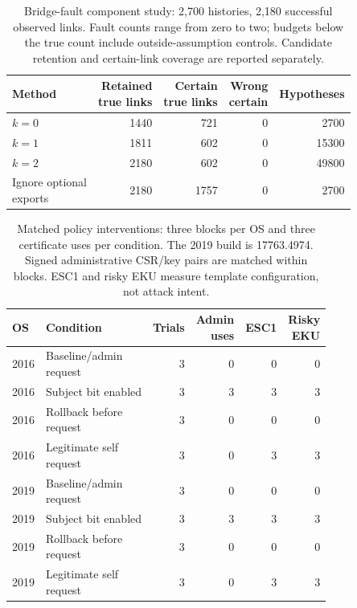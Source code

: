 \begin{table}[tbp]
\centering
\caption{Bridge-fault component study: 2,700 histories, 2,180 successful observed links. Fault counts range from zero to two; budgets below the true count include outside-assumption controls. Candidate retention and certain-link coverage are reported separately.}
\label{tab:bridge_component}
\evidencetable
\begin{tabular}{lrrrr}
\toprule
Method & \makecell{Retained\\true links} & \makecell{Certain\\true links} & \makecell{Wrong\\certain} & Hypotheses \\
\midrule
$k=0$ & 1440 & 721 & 0 & 2700 \\
$k=1$ & 1811 & 602 & 0 & 15300 \\
$k=2$ & 2180 & 602 & 0 & 49800 \\
\makecell[l]{Ignore optional\\exports} & 2180 & 1757 & 0 & 2700 \\
\bottomrule
\end{tabular}
\end{table}
\begin{table}[tbp]
\centering
\caption{Matched policy interventions: three blocks per OS and three certificate uses per condition. The 2019 build is 17763.4974. Signed administrative CSR/key pairs are matched within blocks. ESC1 and risky EKU measure template configuration, not attack intent.}
\label{tab:paired_live_policy}
\evidencetable
\begin{tabular}{llrrrr}
\toprule
OS & Condition & Trials & \makecell{Admin\\uses} & ESC1 & \makecell{Risky\\EKU} \\
\midrule
2016 & \makecell[l]{Baseline/admin\\request} & 3 & 0 & 0 & 0 \\
2016 & Subject bit enabled & 3 & 3 & 3 & 3 \\
2016 & \makecell[l]{Rollback before\\request} & 3 & 0 & 0 & 0 \\
2016 & \makecell[l]{Legitimate self\\request} & 3 & 0 & 3 & 3 \\
2019 & \makecell[l]{Baseline/admin\\request} & 3 & 0 & 0 & 0 \\
2019 & Subject bit enabled & 3 & 3 & 3 & 3 \\
2019 & \makecell[l]{Rollback before\\request} & 3 & 0 & 0 & 0 \\
2019 & \makecell[l]{Legitimate self\\request} & 3 & 0 & 3 & 3 \\
\bottomrule
\end{tabular}
\end{table}
